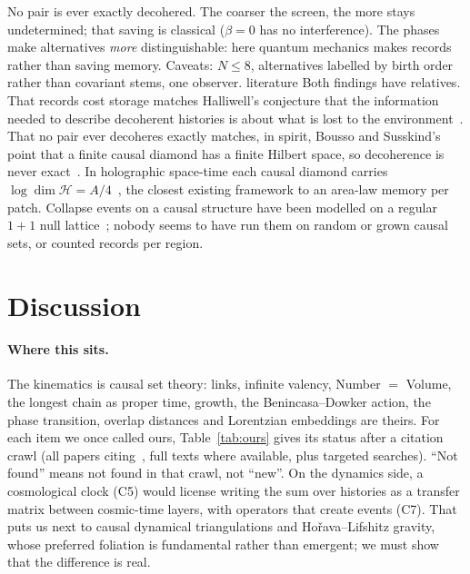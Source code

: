 \documentclass[11pt,a4paper]{article}
\newcommand{\tagbox}[2]{\textsf{\scriptsize\colorbox{#1!12}{\textcolor{#1!70!black}{#2}}}}
\newcommand{\lit}{\tagbox{blue}{literature}}
\begin{document}
No pair is ever exactly decohered. The coarser the screen, the more stays undetermined; that saving is classical ($\beta=0$ has no interference). The phases make alternatives \emph{more} distinguishable: here quantum mechanics makes records rather than saving memory. Caveats: $N\le8$, alternatives labelled by birth order rather than covariant stems, one observer. \lit{} Both findings have relatives. That records cost storage matches Halliwell's conjecture that the information needed to describe decoherent histories is about what is lost to the environment~\cite{Halliwell99}. That no pair ever decoheres exactly matches, in spirit, Bousso and Susskind's point that a finite causal diamond has a finite Hilbert space, so decoherence is never exact~\cite{BoussoSusskind11}. In holographic space-time each causal diamond carries $\log\dim\mathcal H=A/4$~\cite{Banks13}, the closest existing framework to an area-law memory per patch. Collapse events on a causal structure have been modelled on a regular $1+1$ null lattice~\cite{DowkerHenson02,DowkerHerbauts04}; nobody seems to have run them on random or grown causal sets, or counted records per region.

\section{Discussion}\label{sec:disc}
\paragraph{Where this sits.} The kinematics is causal set theory: links, infinite valency, Number $=$ Volume, the longest chain as proper time, growth, the Benincasa--Dowker action, the phase transition, overlap distances and Lorentzian embeddings are theirs. For each item we once called ours, Table~\ref{tab:ours} gives its status after a citation crawl (all papers citing~\cite{BK24,Johnston08,Johnston09,NXDS17,BK25}, full texts where available, plus targeted searches). ``Not found'' means not found in that crawl, not ``new''. On the dynamics side, a cosmological clock (C5) would license writing the sum over histories as a transfer matrix between cosmic-time layers, with operators that create events (C7). That puts us next to causal dynamical triangulations and Hořava--Lifshitz gravity, whose preferred foliation is fundamental rather than emergent; we must show that the difference is real.
\end{document}
